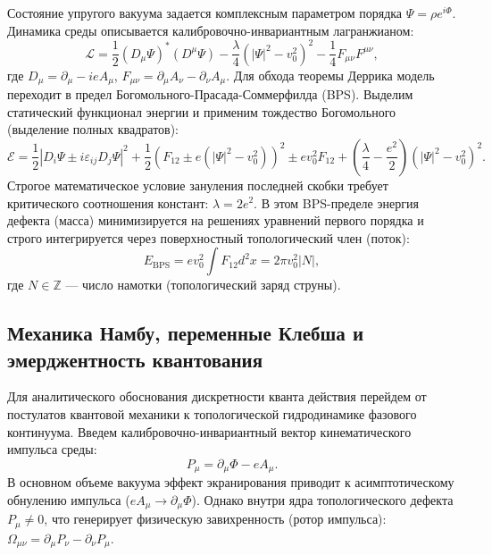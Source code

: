 \documentclass[11pt,a4paper]{article}
\begin{document}
	Состояние упругого вакуума задается комплексным параметром порядка $\Psi = \rho e^{i\Phi}$. Динамика среды описывается калибровочно-инвариантным лагранжианом:
	\begin{equation}
		\mathcal{L} = \frac{1}{2} (D_\mu \Psi)^* (D^\mu \Psi) - \frac{\lambda}{4} (|\Psi|^2 - v_0^2)^2 - \frac{1}{4} F_{\mu\nu} F^{\mu\nu},
		\label{eq:lagrangian}
	\end{equation}
	где $D_\mu = \partial_\mu - i e A_\mu$, $F_{\mu\nu} = \partial_\mu A_\nu - \partial_\nu A_\mu$. 
	Для обхода теоремы Деррика модель переходит в предел Богомольного-Прасада-Соммерфилда (BPS). Выделим статический функционал энергии и применим тождество Богомольного (выделение полных квадратов):
	\begin{equation}
		\mathcal{E} = \frac{1}{2} |D_i \Psi \pm i \varepsilon_{ij} D_j \Psi|^2 + \frac{1}{2} \left(F_{12} \pm e(|\Psi|^2 - v_0^2)\right)^2 \pm e v_0^2 F_{12} + \left(\frac{\lambda}{4} - \frac{e^2}{2}\right) (|\Psi|^2 - v_0^2)^2.
	\end{equation}
	Строгое математическое условие зануления последней скобки требует критического соотношения констант: $\lambda = 2e^2$. В этом BPS-пределе энергия дефекта (масса) минимизируется на решениях уравнений первого порядка и строго интегрируется через поверхностный топологический член (поток):
	\begin{equation}
		E_{\text{BPS}} = e v_0^2 \int F_{12} d^2x = 2\pi v_0^2 |N|,
	\end{equation}
	где $N \in \mathbb{Z}$ — число намотки (топологический заряд струны).
	
	\subsection{Механика Намбу, переменные Клебша и эмерджентность квантования}
	Для аналитического обоснования дискретности кванта действия перейдем от постулатов квантовой механики к топологической гидродинамике фазового континуума. 
	Введем калибровочно-инвариантный вектор кинематического импульса среды:
	\begin{equation}
		P_\mu = \partial_\mu \Phi - e A_\mu.
	\end{equation}
	В основном объеме вакуума эффект экранирования приводит к асимптотическому обнулению импульса ($e A_\mu \to \partial_\mu \Phi$). Однако внутри ядра топологического дефекта $P_\mu \neq 0$, что генерирует физическую завихренность (ротор импульса): $\Omega_{\mu\nu} = \partial_\mu P_\nu - \partial_\nu P_\mu$.
	
\end{document}
